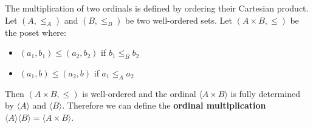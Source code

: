 \documentclass{bareminimum}
\begin{document}
\begin{defn}
	The multiplication  of two ordinals is defined by ordering their Cartesian product. Let $(A, \leq_A)$  and $(B, \leq_B)$ be two well-ordered sets. Let $(A \times B, \leq)$ be the poset where:
	\begin{itemize}
		\item $(a_1, b_1) \leq (a_2, b_2)$ if $b_1 \leq_B b_2$
		\item $(a_1, b) \leq (a_2, b)$ if $a_1 \leq_A a_2$
	\end{itemize}
	Then $(A \times B, \leq)$ is well-ordered and the ordinal $\langle A \times B \rangle$ is fully determined by $\langle A \rangle$ and $\langle B \rangle$. Therefore we can define the \textbf{ordinal multiplication} $\langle A \rangle \langle B \rangle =  \langle A \times B \rangle$.
\end{defn}

\end{document}
